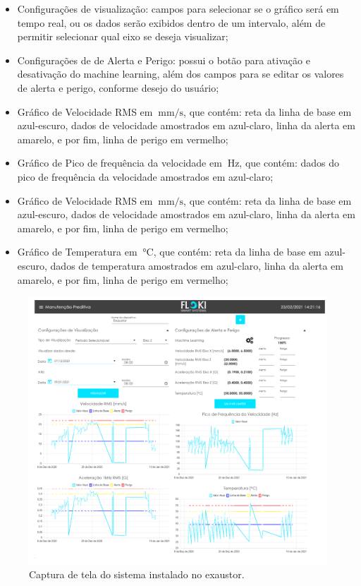 \begin{itemize}
    \item Configurações de visualização: campos para selecionar se o gráfico será em tempo real, ou os dados serão exibidos dentro de um
intervalo, além de permitir selecionar qual eixo se deseja visualizar;
    \item Configurações de de Alerta e Perigo: possui o botão para ativação e desativação do machine learning, além dos campos para se editar
os valores de alerta e perigo, conforme desejo do usuário;
    \item Gráfico de Velocidade RMS em $\SI{}{\milli\metre\per\second}$, que contém: reta da linha de base em azul-escuro, dados de velocidade
amostrados em azul-claro, linha da alerta em amarelo, e por fim, linha de perigo em vermelho;
    \item Gráfico de Pico de frequência da velocidade em $\SI{}{\hertz}$, que contém: dados do pico de frequência da velocidade amostrados em 
    azul-claro; 
    \item Gráfico de Velocidade RMS em $\SI{}{\milli\metre\per\second}$, que contém: reta da linha de base em azul-escuro, dados de velocidade
amostrados em azul-claro, linha da alerta em amarelo, e por fim, linha de perigo em vermelho;
    \item Gráfico de Temperatura em $\SI{}{\celsius}$, que contém: reta da linha de base em azul-escuro, dados de temperatura
amostrados em azul-claro, linha da alerta em amarelo, e por fim, linha de perigo em vermelho;
\end{itemize}

\begin{figure}[H]
    \caption{Captura de tela do sistema instalado no exaustor.}
    \begin{center}
        \includegraphics[scale=0.95, page=1]{resultados/img/resultados.pdf}
    \end{center}
    \label{fig:exaustor_1}
\end{figure}

